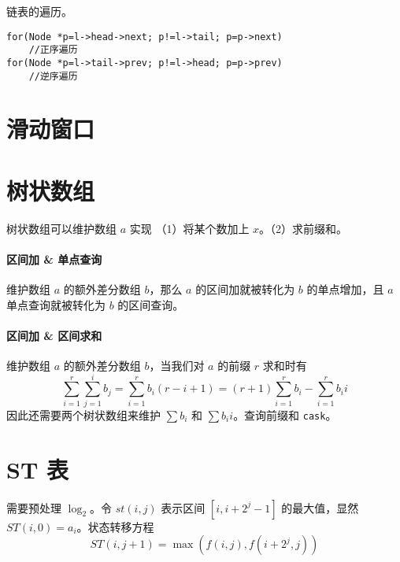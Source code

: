 \documentclass{probook}
\begin{document}
\begin{multicols}{2}
链表的遍历。

\begin{lstlisting}[style=cpp]
for(Node *p=l->head->next; p!=l->tail; p=p->next)
    //正序遍历
for(Node *p=l->tail->prev; p!=l->head; p=p->prev)
    //逆序遍历
\end{lstlisting}

\section{滑动窗口}



\section{树状数组}

树状数组可以维护数组 $a$ 实现 （1）将某个数加上 $x$。（2）求前缀和。



\paragraph{区间加 \& 单点查询}

维护数组 $a$ 的额外差分数组 $b$，那么 $a$ 的区间加就被转化为 $b$ 的单点增加，且 $a$ 单点查询就被转化为 $b$ 的区间查询。



\paragraph{区间加 \& 区间求和}

维护数组 $a$ 的额外差分数组 $b$，当我们对 $a$ 的前缀 $r$ 求和时有
$$\sum_{i=1}^r \sum_{j=1}^i b_j = \sum_{i=1}^rb_i(r-i+1) = (r+1)\sum_{i=1}^rb_i - \sum_{i=1}^rb_ii$$
因此还需要两个树状数组来维护 $\sum b_i$ 和 $\sum b_ii$。查询前缀和 \verb|cask|。



\section{ST 表}

需要预处理 $\log_2$。令 $st(i,j)$ 表示区间 $[i,i+2^j-1]$ 的最大值，显然 $ST(i,0)=a_i$。状态转移方程
$$ST(i,j+1) = \max(f(i,j) , f(i+2^{j},j))$$


\end{multicols}
\end{document}
